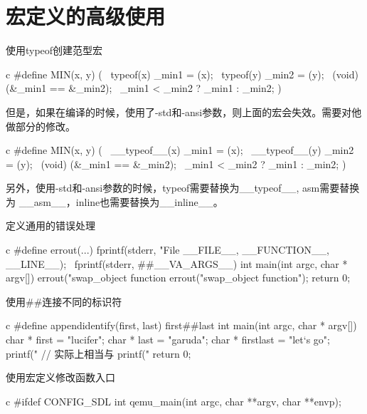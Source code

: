 \section{宏定义的高级使用}
\begin{outline}[enumerate]

\1 使用typeof创建范型宏
\begin{code-in-enumerate}{c}
#define MIN(x, y) ({                \
    typeof(x) _min1 = (x);          \
    typeof(y) _min2 = (y);          \
    (void) (&_min1 == &_min2);      \
    _min1 < _min2 ? _min1 : _min2; })
\end{code-in-enumerate}
\par{} \linewidth\textwidth
\setlength{\parindent}{2em}
但是，如果在编译的时候，使用了-std和-ansi参数，则上面的宏会失效。需要对他做部分的修改。
\begin{code-in-enumerate}{c}
#define MIN(x, y) ({                    \
    __typeof__(x) _min1 = (x);          \
    __typeof__(y) _min2 = (y);          \
    (void) (&_min1 == &_min2);          \
    _min1 < _min2 ? _min1 : _min2; })
\end{code-in-enumerate}
\par\parshape0 \linewidth\textwidth
\setlength{\parindent}{2em}
另外，使用-std和-ansi参数的时候，typeof需要替换为\_\_typeof\_\_, asm需要替换为
\_\_asm\_\_，inline也需要替换为\_\_inline\_\_。

\1 定义通用的错误处理
\begin{code-in-enumerate}{c}
#define errout(...) fprintf(stderr, "File %
        __FILE__, __FUNCTION__, __LINE__);                          \
        fprintf(stderr, ##__VA_ARGS__)
int main(int argc, char * argv[])
{
    errout("swap_object function %
    errout("swap_object function\n");
    return 0;
}
\end{code-in-enumerate}

\1 使用\#\#连接不同的标识符
\begin{code-in-enumerate}{c}
#define appendidentify(first, last) first##last
int main(int argc, char * argv[])
{
    char * first = "lucifer";
    char * last = "garuda";
    char * firstlast = "let`s go";
    printf("%
    // 实际上相当与 printf("%
    return 0;
}
\end{code-in-enumerate}

\1 使用宏定义修改函数入口
\begin{code-in-enumerate}{c}
#ifdef CONFIG_SDL
int qemu_main(int argc, char **argv, char **envp);


\end{code-in-enumerate}
\end{outline}
